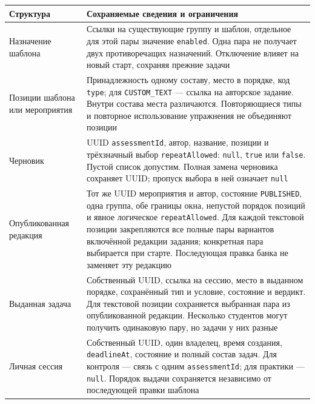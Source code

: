\documentclass[12pt,a4paper]{article}
\newcounter{none} %
\begin{document}
{\def\LTcaptype{none} %
\begin{longtable}[]{@{}
  >{\raggedright\arraybackslash}p{}
  >{\raggedright\arraybackslash}p{}@{}}
\toprule\noalign{}
\begin{minipage}[b]{\linewidth}\raggedright
Структура
\end{minipage} & \begin{minipage}[b]{\linewidth}\raggedright
Сохраняемые сведения и ограничения
\end{minipage} \\
\midrule\noalign{}
\endhead
\bottomrule\noalign{}
\endlastfoot
Назначение шаблона & Ссылки на существующие группу и шаблон, отдельное для этой пары значение \texttt{enabled}. Одна пара не получает двух противоречащих назначений. Отключение влияет на новый старт, сохраняя прежние задачи \\
Позиции шаблона или мероприятия & Принадлежность одному составу, место в порядке, код \texttt{type}; для \texttt{CUSTOM\_\allowbreak{}TEXT} --- ссылка на авторское задание. Внутри состава места различаются. Повторяющиеся типы и повторное использование упражнения не объединяют позиции \\
Черновик & UUID \texttt{assessment\allowbreak{}Id}, автор, название, позиции и трёхзначный выбор \texttt{repeat\allowbreak{}Allowed}: \texttt{null}, \texttt{true} или \texttt{false}. Пустой список допустим. Полная замена черновика сохраняет UUID; пропуск выбора в ней означает \texttt{null} \\
Опубликованная редакция & Тот же UUID мероприятия и автор, состояние \texttt{PUBLISHED}, одна группа, обе границы окна, непустой порядок позиций и явное логическое \texttt{repeat\allowbreak{}Allowed}. Для каждой текстовой позиции закрепляются все полные пары вариантов включённой редакции задания; конкретная пара выбирается при старте. Последующая правка банка не заменяет эту редакцию \\
Выданная задача & Собственный UUID, ссылка на сессию, место в выданном порядке, сохранённый тип и условие, состояние и вердикт. Для текстовой позиции сохраняется выбранная пара из опубликованной редакции. Несколько студентов могут получить одинаковую пару, но задачи у них разные \\
Личная сессия & Собственный UUID, один владелец, время создания, \texttt{deadlineAt}, состояние и полный состав задач. Для контроля --- связь с одним \texttt{assessment\allowbreak{}Id}; для практики --- \texttt{null}. Порядок выдачи сохраняется независимо от последующей правки шаблона \\
\end{longtable}
}
\end{document}
